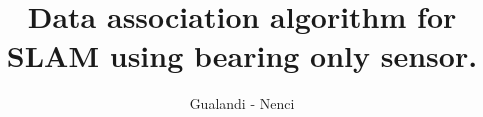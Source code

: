 \documentclass[12pt]{report}
\title{Data association algorithm for SLAM using bearing only sensor.}
\author{Gualandi - Nenci}
\begin{document}
\maketitle
\tableofcontents

\label{Introduction}


\label{Algorithm}


\label{SideProjects}


\label{Conclusions}

\end{document}
